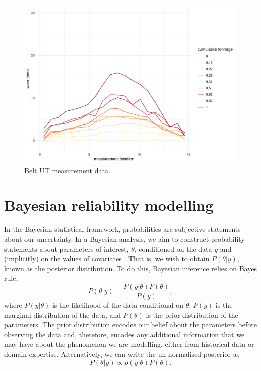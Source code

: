 \begin{figure}[h]
  \centering
  \includegraphics[width=1\textwidth]{./figures/belt_wear_ut.pdf}
  \caption{Belt UT measurement data.}
  \label{fig:belt_wear_ut}
\end{figure}

\section{Bayesian reliability modelling}
\label{sec:Bayesian-methods}

In the Bayesian statistical framework, probabilities are subjective statements about our uncertainty. In a Bayesian analysis, we aim to construct probability statements about parameters of interest, $\theta$, conditioned on the data $y$ and (implicitly) on the values of covariates \citep{BDA2020}. That is, we wish to obtain $P(\theta|y)$, known as the posterior distribution. To do this, Bayesian inference relies on Bayes rule,
\begin{equation}
  P(\theta|y) = \frac{P(y|\theta)P(\theta)}{P(y)},
\end{equation}
where $P(y|\theta)$ is the likelihood of the data conditional on $\theta$, $P(y)$ is the marginal distribution of the data, and $P(\theta)$ is the prior distribution of the parameters. The prior distribution encodes our belief about the parameters before observing the data and, therefore, encodes any additional information that we may have about the phenomenon we are modelling, either from historical data or domain expertise. Alternatively, we can write the un-normalised posterior as
\begin{equation}
  P(\theta|y) \propto p(y|\theta)P(\theta).
\end{equation}

